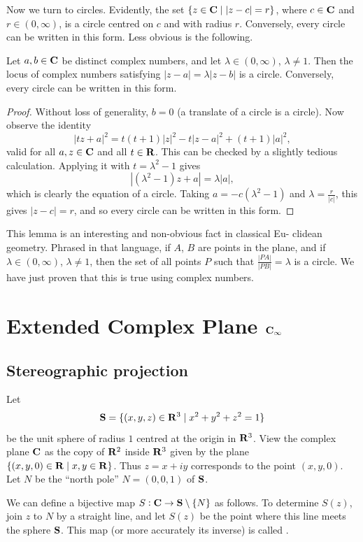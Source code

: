 Now we turn to circles. Evidently, the set $\{z\in\mathbf C\mid|z-c|=r\}$, where $c\in\mathbf C$ and $r\in(0,\infty)$, is a circle centred on $c$ and with radius $r$. Conversely, every circle can be written in this form. Less obvious is the following.

\begin{lemma}[Circles]
Let $a,b\in\mathbf C$ be distinct complex numbers, and let $\lambda\in(0,\infty)$, $\lambda\neq1$. Then the locus of complex numbers satisfying $|z-a|=\lambda|z-b|$ is a circle. Conversely, every circle can be written in this form.
\end{lemma}

\begin{proof}
Without loss of generality, $b=0$ (a translate of a circle is a circle). Now observe the identity
\[|tz+a|^2=t(t+1)|z|^2-t|z-a|^2+(t+1)|a|^2,\]
valid for all $a,z\in\mathbf C$ and all $t\in\mathbf R$. This can be checked by a slightly tedious calculation. Applying it with $t=\lambda^2-1$ gives
\[|(\lambda^2-1)z+a|=\lambda|a|,\]
which is clearly the equation of a circle. Taking $a=-c(\lambda^2-1)$ and $\lambda=\frac{r}{|c|}$, this gives $|z-c|=r$, and so every circle can be written in this form.
\end{proof}

\begin{remark}
This lemma is an interesting and non-obvious fact in classical Eu-
clidean geometry. Phrased in that language, if $A$, $B$ are points in the plane, and if $\lambda\in(0,\infty)$, $\lambda\neq1$, then the set of all points $P$ such that $\frac{|PA|}{|PB|}=\lambda$ is a circle. We have just proven that this is true using complex numbers.
\end{remark}

\section{Extended Complex Plane $\mathbf C_\infty$}
\subsection{Stereographic projection}
Let
\[\mathbf S=\{(x,y,z)\in\mathbf R^3\mid x^2+y^2+z^2=1\}\]
be the unit sphere of radius $1$ centred at the origin in $\mathbf R^3$. View the complex plane $\mathbf C$ as the copy of $\mathbf R^2$ inside $\mathbf R^3$ given by the plane $\{(x,y,0)\in\mathbf R\mid x,y\in\mathbf R\}$. Thus $z=x+iy$ corresponds to the point $(x,y,0)$. Let $N$ be the ``north pole'' $N=(0,0,1)$ of $\mathbf S$.

We can define a bijective map $S:\mathbf C\to\mathbf S\setminus\{N\}$ as follows. To determine $S(z)$, join $z$ to $N$ by a straight line, and let $S(z)$ be the point where this line meets the sphere $\mathbf S$. This map (or more accurately its inverse) is called .

